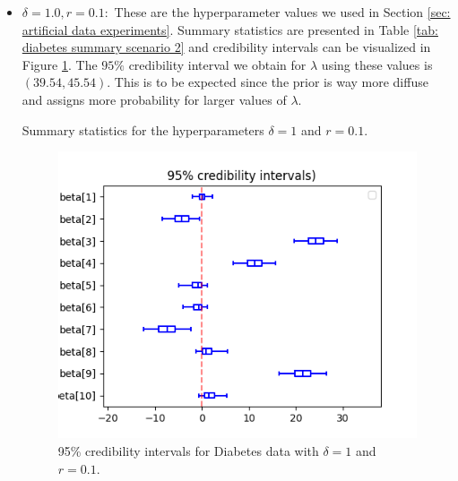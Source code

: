 \documentclass[a4paper, 10pt]{article}
\begin{document}
\begin{itemize}
    \item $ \delta = 1.0, r = 0.1: $
    These are the hyperparameter values we used in Section \ref{sec: artificial data experiments}.
    Summary statistics are presented in Table \ref{tab: diabetes summary scenario 2} and credibility intervals can be visualized in Figure \ref{fig: diabetes credibility scenario 2}.
    The $ 95\% $ credibility interval we obtain for $ \lambda $ using these values is $ ( 39.54, 45.54 ) $.
    This is to be expected since the prior is way more diffuse and assigns more probability for larger values of $ \lambda $.
    \begin{table}[htb]
        \centering
        
        \caption{Summary statistics for the hyperparameters $ \delta = 1 $ and $ r = 0.1 $.}
        \label{tab: diabetes summary scenario 2}
    \end{table}
\begin{figure}
    \centering
    \includegraphics[width=.6\textwidth]{../outputs/diabetes_data/scenario_2/credibility_intervals.png}
    \caption{95\% credibility intervals for Diabetes data with $ \delta = 1 $ and $ r = 0.1 $.}
    \label{fig: diabetes credibility scenario 2}
\end{figure}


\end{itemize}
\end{document}
